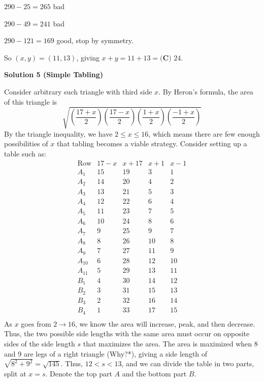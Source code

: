 \begin{enumerate}
 $290-25=265$ bad

 $290-49=241$ bad

 $290-121=169$ good, stop by symmetry.

 So $(x,y)=(11,13)$, giving $x+y=11+13=\boxed{\textbf{(C) } 24}$.

 



\textbf{Solution 5 (Simple Tabling)}

Consider arbitrary such triangle with third side \(x\). By Heron's formula, the area of this triangle is
 \[\sqrt{\left(\frac{17+x}{2}\right)\left(\frac{17-x}{2}\right)\left(\frac{1+x}{2}\right)\left(\frac{-1+x}{2}\right)}\]By the triangle inequality, we have \(2 \leq x \leq 16\), which means there are few enough possibilities of \(x\) that tabling becomes a viable strategy. Consider setting up a table such as:
 \[\begin{array}{c|c|c|c|c}     \text{Row}&17-x&x+17&x+1&x-1 \\     \hline      A_1&15& 19& 3&  1\\     A_2&14& 20& 4&  2\\     A_3&13& 21& 5&  3\\     A_4&12& 22& 6&  4\\     A_5&11& 23& 7&  5\\     A_6&10& 24& 8&  6\\     A_7&9&  25& 9&  7\\     A_8&8&  26& 10& 8\\     A_9&7&  27& 11& 9\\     A_{10}&6&  28& 12& 10\\     A_{11}&5&  29& 13& 11\\     \hline     B_{1}&4&  30& 14& 12\\     B_{2}&3&  31& 15& 13\\     B_{3}&2&  32& 16& 14\\     B_{4}&1&  33& 17& 15\\     \end{array}\]As \(x\) goes from \(2\to 16\), we know the area will increase, peak, and then decrease. Thus, the two possible side lengths with the same area must occur on opposite sides of the side length \(s\) that maximizes the area. The area is maximized when 8 and 9 are legs of a right triangle (Why?*), giving a side length of \(\sqrt{8^2+9^2}=\sqrt{145}\). Thus, \(12 < s < 13\), and we can divide the table in two parts, split at \(x=s\). Denote the top part \(A\) and the bottom part \(B\).


\end{enumerate}
